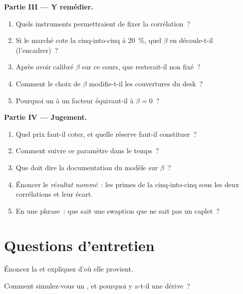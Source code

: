 \begin{problem}
\medskip\noindent\textbf{Partie III --- Y remédier.}
\begin{enumerate}[resume]
\item Quels instruments permettraient de fixer la corrélation~?
\item Si le marché cote la cinq-into-cinq à 20~\%, quel $\beta$ en découle-t-il
(l'encadrer)~?
\item Après avoir calibré $\beta$ sur ce cours, que resterait-il non fixé~?
\item Comment le choix de $\beta$ modifie-t-il les couvertures du desk~?
\item Pourquoi un  à un facteur équivaut-il à $\beta=0$~?
\end{enumerate}

\medskip\noindent\textbf{Partie IV --- Jugement.}
\begin{enumerate}[resume]
\item Quel prix faut-il coter, et quelle réserve faut-il constituer~?
\item Comment suivre ce paramètre dans le temps~?
\item Que doit dire la documentation du modèle sur $\beta$~?
\item Énoncer le \emph{résultat nommé}~: les primes de la cinq-into-cinq sous les deux
corrélations et leur écart.
\item En une phrase~: que sait une swaption que ne sait pas un caplet~?
\end{enumerate}
\end{problem}

\section{Questions d'entretien}

\begin{interviewq}\label{iq:rc:forward-rate-and-market-models:1}
Énoncez la  et expliquez d'où elle provient.
\end{interviewq}

\begin{interviewq}\label{iq:rc:forward-rate-and-market-models:2}
Comment simulez-vous un , et pourquoi y a-t-il une dérive~?
\end{interviewq}

